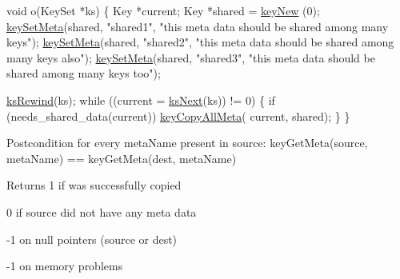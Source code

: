 \begin{DoxyCode}
\textcolor{keywordtype}{void} o(KeySet *ks)
\{
        Key *current;
        Key *shared = \hyperlink{group__key_gad23c65b44bf48d773759e1f9a4d43b89}{keyNew} (0);
        \hyperlink{group__keymeta_gae1f15546b234ffb6007d8a31178652b9}{keySetMeta}(shared, \textcolor{stringliteral}{"shared1"}, \textcolor{stringliteral}{"this meta data should be
       shared among many keys"});
        \hyperlink{group__keymeta_gae1f15546b234ffb6007d8a31178652b9}{keySetMeta}(shared, \textcolor{stringliteral}{"shared2"}, \textcolor{stringliteral}{"this meta data should be
       shared among many keys also"});
        \hyperlink{group__keymeta_gae1f15546b234ffb6007d8a31178652b9}{keySetMeta}(shared, \textcolor{stringliteral}{"shared3"}, \textcolor{stringliteral}{"this meta data should be
       shared among many keys too"});

        \hyperlink{group__keyset_gabe793ff51f1728e3429c84a8a9086b70}{ksRewind}(ks);
        \textcolor{keywordflow}{while} ((current = \hyperlink{group__keyset_ga317321c9065b5a4b3e33fe1c399bcec9}{ksNext}(ks)) != 0)
        \{
                \textcolor{keywordflow}{if} (needs\_shared\_data(current)) \hyperlink{group__keymeta_ga8e63720a65610a29597494d0671f9401}{keyCopyAllMeta}(
      current, shared);
        \}
\}
\end{DoxyCode}


\begin{DoxyPostcond}{Postcondition}
for every meta\-Name present in source\-: key\-Get\-Meta(source, meta\-Name) == key\-Get\-Meta(dest, meta\-Name)
\end{DoxyPostcond}
\begin{DoxyReturn}{Returns}
1 if was successfully copied 

0 if source did not have any meta data 

-\/1 on null pointers (source or dest) 

-\/1 on memory problems 
\end{DoxyReturn}

